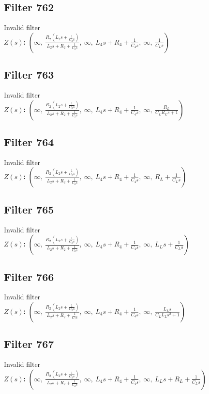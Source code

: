 \documentclass{article}
\begin{document}
\subsection*{Filter 762}
Invalid filter \\ 
\textbf{$Z(s)$:} $\left( \infty, \  \frac{R_{2} \left(L_{2} s + \frac{1}{C_{2} s}\right)}{L_{2} s + R_{2} + \frac{1}{C_{2} s}}, \  \infty, \  L_{4} s + R_{4} + \frac{1}{C_{4} s}, \  \infty, \  \frac{1}{C_{L} s}\right)$ \\ 
\subsection*{Filter 763}
Invalid filter \\ 
\textbf{$Z(s)$:} $\left( \infty, \  \frac{R_{2} \left(L_{2} s + \frac{1}{C_{2} s}\right)}{L_{2} s + R_{2} + \frac{1}{C_{2} s}}, \  \infty, \  L_{4} s + R_{4} + \frac{1}{C_{4} s}, \  \infty, \  \frac{R_{L}}{C_{L} R_{L} s + 1}\right)$ \\ 
\subsection*{Filter 764}
Invalid filter \\ 
\textbf{$Z(s)$:} $\left( \infty, \  \frac{R_{2} \left(L_{2} s + \frac{1}{C_{2} s}\right)}{L_{2} s + R_{2} + \frac{1}{C_{2} s}}, \  \infty, \  L_{4} s + R_{4} + \frac{1}{C_{4} s}, \  \infty, \  R_{L} + \frac{1}{C_{L} s}\right)$ \\ 
\subsection*{Filter 765}
Invalid filter \\ 
\textbf{$Z(s)$:} $\left( \infty, \  \frac{R_{2} \left(L_{2} s + \frac{1}{C_{2} s}\right)}{L_{2} s + R_{2} + \frac{1}{C_{2} s}}, \  \infty, \  L_{4} s + R_{4} + \frac{1}{C_{4} s}, \  \infty, \  L_{L} s + \frac{1}{C_{L} s}\right)$ \\ 
\subsection*{Filter 766}
Invalid filter \\ 
\textbf{$Z(s)$:} $\left( \infty, \  \frac{R_{2} \left(L_{2} s + \frac{1}{C_{2} s}\right)}{L_{2} s + R_{2} + \frac{1}{C_{2} s}}, \  \infty, \  L_{4} s + R_{4} + \frac{1}{C_{4} s}, \  \infty, \  \frac{L_{L} s}{C_{L} L_{L} s^{2} + 1}\right)$ \\ 
\subsection*{Filter 767}
Invalid filter \\ 
\textbf{$Z(s)$:} $\left( \infty, \  \frac{R_{2} \left(L_{2} s + \frac{1}{C_{2} s}\right)}{L_{2} s + R_{2} + \frac{1}{C_{2} s}}, \  \infty, \  L_{4} s + R_{4} + \frac{1}{C_{4} s}, \  \infty, \  L_{L} s + R_{L} + \frac{1}{C_{L} s}\right)$ \\ 
\end{document}
